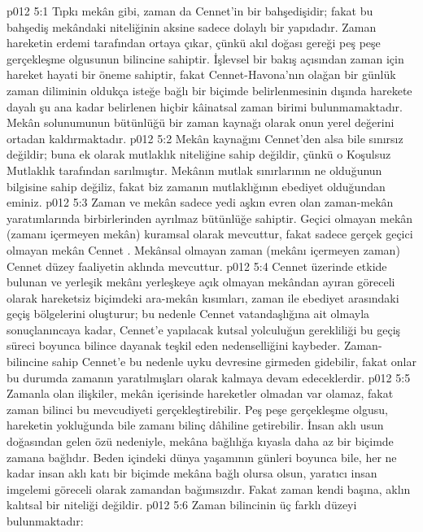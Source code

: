 \vs p012 5:1 Tıpkı mekân gibi, zaman da Cennet’in bir bahşedişidir; fakat bu bahşediş mekândaki niteliğinin aksine sadece dolaylı bir yapıdadır. Zaman hareketin erdemi tarafından ortaya çıkar, çünkü akıl doğası gereği peş peşe gerçekleşme olgusunun bilincine sahiptir. İşlevsel bir bakış açısından zaman için hareket hayati bir öneme sahiptir, fakat Cennet\hyp{}Havona’nın olağan bir günlük zaman diliminin oldukça isteğe bağlı bir biçimde belirlenmesinin dışında harekete dayalı şu ana kadar belirlenen hiçbir kâinatsal zaman birimi bulunmamaktadır. Mekân solunumunun bütünlüğü bir zaman kaynağı olarak onun yerel değerini ortadan kaldırmaktadır.
\vs p012 5:2 Mekân kaynağını Cennet’den alsa bile sınırsız değildir; buna ek olarak mutlaklık niteliğine sahip değildir, çünkü o Koşulsuz Mutlaklık tarafından sarılmıştır. Mekânın mutlak sınırlarının ne olduğunun bilgisine sahip değiliz, fakat biz zamanın mutlaklığının ebediyet olduğundan eminiz.
\vs p012 5:3 Zaman ve mekân sadece yedi aşkın evren olan zaman\hyp{}mekân yaratımlarında birbirlerinden ayrılmaz bütünlüğe sahiptir. Geçici olmayan mekân (zamanı içermeyen mekân) kuramsal olarak mevcuttur, fakat sadece gerçek geçici olmayan mekân Cennet . Mekânsal olmayan zaman (mekânı içermeyen zaman) Cennet düzey faaliyetin aklında mevcuttur.
\vs p012 5:4 Cennet üzerinde etkide bulunan ve yerleşik mekânı yerleşkeye açık olmayan mekândan ayıran göreceli olarak hareketsiz biçimdeki ara\hyp{}mekân kısımları, zaman ile ebediyet arasındaki geçiş bölgelerini oluşturur; bu nedenle Cennet vatandaşlığına ait olmayla sonuçlanıncaya kadar, Cennet’e yapılacak kutsal yolculuğun gerekliliği bu geçiş süreci boyunca bilince dayanak teşkil eden nedenselliğini kaybeder. Zaman\hyp{}bilincine sahip  Cennet’e bu nedenle uyku devresine girmeden gidebilir, fakat onlar bu durumda zamanın yaratılmışları olarak kalmaya devam edeceklerdir.
\vs p012 5:5 Zamanla olan ilişkiler, mekân içerisinde hareketler olmadan var olamaz, fakat zaman bilinci bu mevcudiyeti gerçekleştirebilir. Peş peşe gerçekleşme olgusu, hareketin yokluğunda bile zamanı bilinç dâhiline getirebilir. İnsan aklı usun doğasından gelen özü nedeniyle, mekâna bağlılığa kıyasla daha az bir biçimde zamana bağlıdır. Beden içindeki dünya yaşamının günleri boyunca bile, her ne kadar insan aklı katı bir biçimde mekâna bağlı olursa olsun, yaratıcı insan imgelemi göreceli olarak zamandan bağımsızdır. Fakat zaman kendi başına, aklın kalıtsal bir niteliği değildir.
\vs p012 5:6 Zaman bilincinin üç farklı düzeyi bulunmaktadır:
